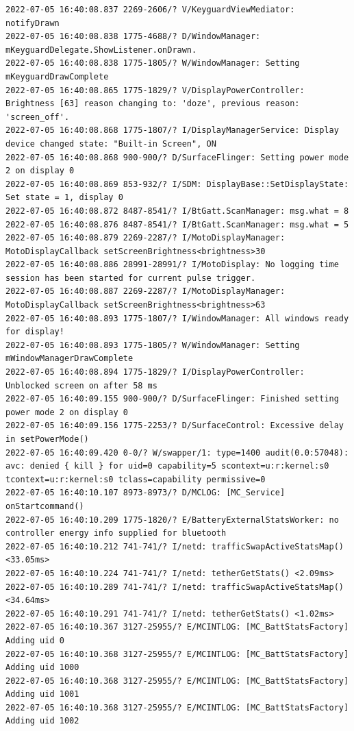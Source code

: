 \documentclass[a4paper,12pt]{book}
\begin{document}
\begin{lstlisting}
2022-07-05 16:40:08.837 2269-2606/? V/KeyguardViewMediator: notifyDrawn
2022-07-05 16:40:08.838 1775-4688/? D/WindowManager: mKeyguardDelegate.ShowListener.onDrawn.
2022-07-05 16:40:08.838 1775-1805/? W/WindowManager: Setting mKeyguardDrawComplete
2022-07-05 16:40:08.865 1775-1829/? V/DisplayPowerController: Brightness [63] reason changing to: 'doze', previous reason: 'screen_off'.
2022-07-05 16:40:08.868 1775-1807/? I/DisplayManagerService: Display device changed state: "Built-in Screen", ON
2022-07-05 16:40:08.868 900-900/? D/SurfaceFlinger: Setting power mode 2 on display 0
2022-07-05 16:40:08.869 853-932/? I/SDM: DisplayBase::SetDisplayState: Set state = 1, display 0
2022-07-05 16:40:08.872 8487-8541/? I/BtGatt.ScanManager: msg.what = 8
2022-07-05 16:40:08.876 8487-8541/? I/BtGatt.ScanManager: msg.what = 5
2022-07-05 16:40:08.879 2269-2287/? I/MotoDisplayManager: MotoDisplayCallback setScreenBrightness<brightness>30
2022-07-05 16:40:08.886 28991-28991/? I/MotoDisplay: No logging time session has been started for current pulse trigger.
2022-07-05 16:40:08.887 2269-2287/? I/MotoDisplayManager: MotoDisplayCallback setScreenBrightness<brightness>63
2022-07-05 16:40:08.893 1775-1807/? I/WindowManager: All windows ready for display!
2022-07-05 16:40:08.893 1775-1805/? W/WindowManager: Setting mWindowManagerDrawComplete
2022-07-05 16:40:08.894 1775-1829/? I/DisplayPowerController: Unblocked screen on after 58 ms
2022-07-05 16:40:09.155 900-900/? D/SurfaceFlinger: Finished setting power mode 2 on display 0
2022-07-05 16:40:09.156 1775-2253/? D/SurfaceControl: Excessive delay in setPowerMode()
2022-07-05 16:40:09.420 0-0/? W/swapper/1: type=1400 audit(0.0:57048): avc: denied { kill } for uid=0 capability=5 scontext=u:r:kernel:s0 tcontext=u:r:kernel:s0 tclass=capability permissive=0
2022-07-05 16:40:10.107 8973-8973/? D/MCLOG: [MC_Service] onStartcommand()
2022-07-05 16:40:10.209 1775-1820/? E/BatteryExternalStatsWorker: no controller energy info supplied for bluetooth
2022-07-05 16:40:10.212 741-741/? I/netd: trafficSwapActiveStatsMap() <33.05ms>
2022-07-05 16:40:10.224 741-741/? I/netd: tetherGetStats() <2.09ms>
2022-07-05 16:40:10.289 741-741/? I/netd: trafficSwapActiveStatsMap() <34.64ms>
2022-07-05 16:40:10.291 741-741/? I/netd: tetherGetStats() <1.02ms>
2022-07-05 16:40:10.367 3127-25955/? E/MCINTLOG: [MC_BattStatsFactory] Adding uid 0
2022-07-05 16:40:10.368 3127-25955/? E/MCINTLOG: [MC_BattStatsFactory] Adding uid 1000
2022-07-05 16:40:10.368 3127-25955/? E/MCINTLOG: [MC_BattStatsFactory] Adding uid 1001
2022-07-05 16:40:10.368 3127-25955/? E/MCINTLOG: [MC_BattStatsFactory] Adding uid 1002

\end{lstlisting}
\end{document}
